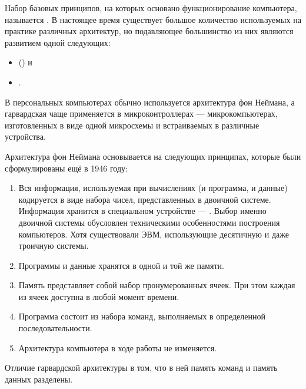 Набор базовых принципов, на которых основано функционирование
компьютера, называется . В
настоящее время существует большое количество используемых на практике
различных архитектур, но подавляющее большинство из них являются
развитием одной следующих:

\begin{itemize}
\item {}
  () и
\item {}.
\end{itemize}

В персональных компьютерах обычно используется архитектура фон
Неймана, а гарвардская чаще применяется в микроконтроллерах —
микрокомпьютерах, изготовленных в виде одной микросхемы и встраиваемых
в различные устройства.

Архитектура фон Неймана основывается на следующих принципах, которые
были сформулированы ещё в 1946 году:

\begin{enumerate}
\item {} Вся информация, используемая при вычислениях (и
  программа, и данные) кодируется в виде набора чисел, представленных
  в двоичной системе. Информация хранится в специальном устройстве —
  . Выбор именно двоичной системы обусловлен
  техническими особенностями построения компьютеров. Хотя существовали
  ЭВМ, использующие десятичную и даже троичную системы.
\item {}
  Программы и данные хранятся в одной и той же памяти.
\item {}
  Память представляет собой набор пронумерованных ячеек. При этом
  каждая из ячеек доступна в любой момент времени.
\item {} Программа состоит из набора команд, выполняемых в
  определенной последовательности.
\item {} Архитектура компьютера в ходе работы не изменяется.
\end{enumerate}

Отличие гарвардской архитектуры в том, что в ней память команд и
память данных разделены.

